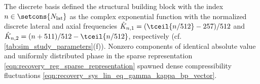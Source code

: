 The discrete  basis defined
the structural building block with
the index
$n \in \setcons{ N_{\text{lat}} }$ as
the complex exponential function with
the normalized discrete lateral and
axial frequencies
$\hat{K}_{ n, 1 } = ( \tceil{ n / 512 } - 257 ) / 512$ and
$\hat{K}_{ n, 2 } = ( n + 511 ) / 512 - \tceil{ n / 512 }$,
respectively
(cf. \cref{tab:sim_study_parameters}(f)).
Nonzero components of
identical absolute value and
uniformly distributed phase in
the sparse representation
\eqref{eqn:recovery_reg_sparse_representation} spawned
dense compressibility fluctuations
\eqref{eqn:recovery_sys_lin_eq_gamma_kappa_bp_vector}.
